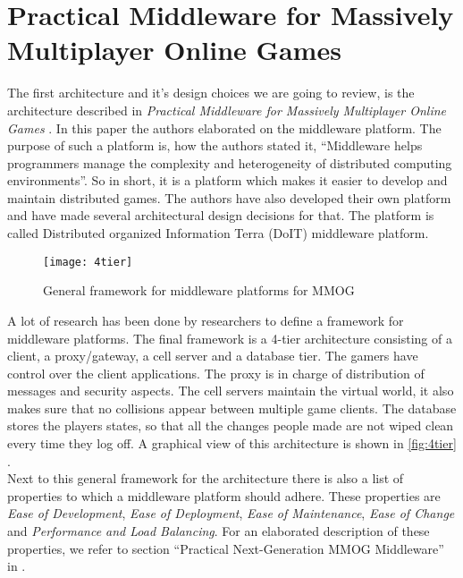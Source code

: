 \section*{Practical Middleware for Massively Multiplayer Online Games}
The first architecture and it's design choices we are going to review, is the architecture described in \emph{Practical Middleware for Massively Multiplayer Online Games} \cite{middleware}.
In this paper the authors elaborated on the middleware platform. 
The purpose of such a platform is, how the authors stated it, ``Middleware helps programmers manage the complexity and heterogeneity of distributed computing environments''. 
So in short, it is a platform which makes it easier to develop and maintain distributed games. The authors have also developed their own platform and have made several architectural design decisions for that. 
The platform is called Distributed organized Information Terra (DoIT) middleware platform. \\

\begin{wrapfigure}{r}{0.5\textwidth}
\begin{center}
\texttt{[image: 4tier]}
\caption{General framework for middleware platforms for MMOG}
\label{fig:4tier}
\end{center}
\end{wrapfigure}

A lot of research has been done by researchers to define a framework for middleware platforms. 
The final framework is a 4-tier architecture consisting of a client, a proxy/gateway, a cell server and a database tier. 
The gamers have control over the client applications. 
The proxy is in charge of distribution of messages and security aspects. 
The cell servers maintain the virtual world, it also makes sure that no collisions appear between multiple game clients. 
The database stores the players states, so that all the changes people made are not wiped clean every time they log off. 
A graphical view of this architecture is shown in \autoref{fig:4tier} \cite{midfig}. \\
Next to this general framework for the architecture there is also a list of properties to which a middleware platform should adhere. 
These properties are \emph{Ease of Development}, \emph{Ease of Deployment}, \emph{Ease of Maintenance}, \emph{Ease of Change} and \emph{Performance and Load Balancing}. 
For an elaborated description of these properties, we refer to section ``Practical Next-Generation MMOG Middleware'' in \cite{middleware}.\\

